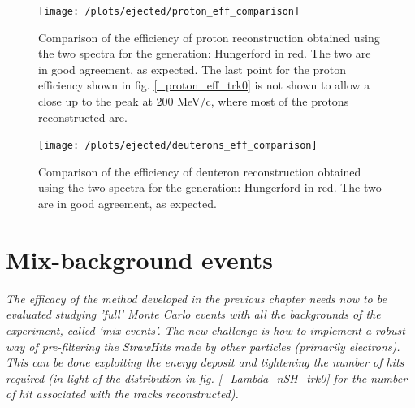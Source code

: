\documentclass[12pt,a4paper,openright, oneside, titlepage]{book} %
\begin{document}
\begin{figure}[!htb]
\centering
\texttt{[image: /plots/ejected/proton\_eff\_comparison]}
\caption{Comparison of the efficiency of proton reconstruction obtained using the two spectra for the generation: Hungerford in red. The two are in good agreement, as expected. The last point for the proton efficiency shown in fig. \ref{_proton_eff_trk0} is not shown to allow a close up to the peak at 200 MeV/c, where most of the protons reconstructed are. }
\label{_proton_eff_comparison}
\end{figure}

\begin{figure}[!htb]
\centering
\texttt{[image: /plots/ejected/deuterons\_eff\_comparison]}
\caption{Comparison of the efficiency of deuteron reconstruction obtained using the two spectra for the generation: Hungerford in red. The two are in good agreement, as expected.}
\label{_deuterons_eff_comparison}
\end{figure}

\chapter{Mix-background events}
{\itshape The efficacy of the method developed in the previous chapter needs now to be evaluated studying 'full' Monte Carlo events with all the backgrounds of the experiment, called `mix-events'. 
The new challenge is how to implement a robust way of pre-filtering the StrawHits made by other particles (primarily electrons). 
This can be done exploiting the energy deposit and tightening the number of hits required (in light of the distribution in fig. \ref{_Lambda_nSH_trk0} for the number of hit associated with the tracks reconstructed).}
\end{document}
